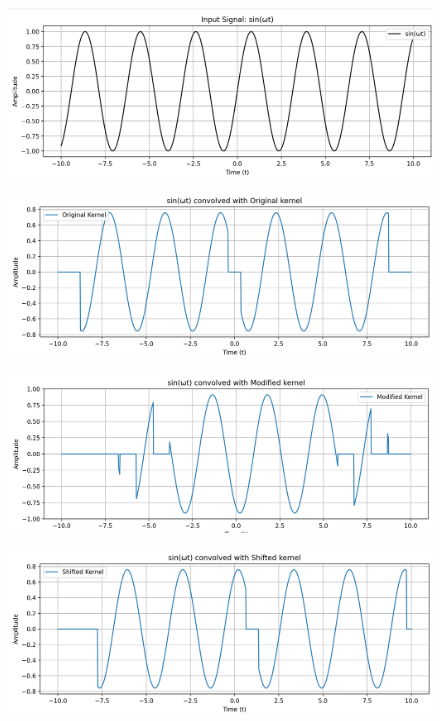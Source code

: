 \documentclass{article}
\begin{document}
\begin{figure}[H]
    \centering
    \includegraphics[width=\linewidth]{figs/sinwt.png}
\end{figure}
\begin{figure}[H]
    \centering
    \includegraphics[width=\linewidth]{figs/sinconv.png}
\end{figure}
\newpage
\begin{figure}[H]
    \centering
    \includegraphics[width=\linewidth]{figs/modifiedsin.png}
\end{figure}
\begin{figure}[H]
    \centering
    \includegraphics[width=\linewidth]{figs/shiftedsin.png}
\end{figure}
\end{document}
